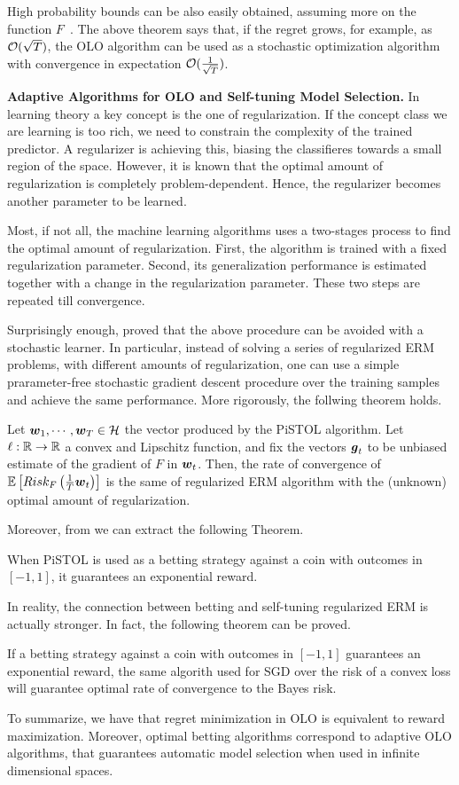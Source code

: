 High probability bounds can be also easily obtained, assuming more on the function $F$~\citep{Cesa-BianchiCG04}.
The above theorem says that, if the regret grows, for example, as $\mathcal{O}(\sqrt{T})$, the OLO algorithm can be used as a stochastic optimization algorithm with convergence in expectation $\mathcal{O}(\frac{1}{\sqrt{T}})$.

\textbf{Adaptive Algorithms for OLO and Self-tuning Model Selection.}
In learning theory a key concept is the one of regularization. If the concept class we are learning is too rich, we need to constrain the complexity of the trained predictor. A regularizer is achieving this, biasing the classifieres towards a small region of the space. However, it is known that the optimal amount of regularization is completely problem-dependent. Hence, the regularizer becomes another parameter to be learned.

Most, if not all, the machine learning algorithms uses a two-stages process to find the optimal amount of regularization. First, the algorithm is trained with a fixed regularization parameter. Second, its generalization performance is estimated together with a change in the regularization parameter. These two steps are repeated till convergence.

Surprisingly enough, \citep{Orabona14} proved that the above procedure can be avoided with a stochastic learner. In particular, instead of solving a series of regularized ERM problems, with different amounts of regularization, one can use a simple prarameter-free stochastic gradient descent procedure over the training samples and achieve the same performance.
More rigorously, the follwing theorem holds.
\begin{theorem}
Let $\boldsymbol{w}_1, \cdots, \boldsymbol{w}_T \in \mathcal{H}$ the vector produced by the PiSTOL algorithm.
Let $\ell:\mathbb{R}\rightarrow\mathbb{R}$ a convex and Lipschitz function, and fix the vectors $\boldsymbol{g}_t$ to be unbiased estimate of the gradient of $F$ in $\boldsymbol{w}_t$. Then, the rate of convergence of $\mathbb{E}\left[Risk_F\left(\frac{1}{T} \boldsymbol{w}_t\right)\right]$ is the same of regularized ERM algorithm with the (unknown) optimal amount of regularization.
\end{theorem}

Moreover, from \citep{} we can extract the following Theorem.
\begin{theorem}
When PiSTOL is used as a betting strategy against a coin with outcomes in $[-1,1]$, it guarantees an exponential reward.
\end{theorem}

In reality, the connection between betting and self-tuning regularized ERM is actually stronger. In fact, the following theorem can be proved.
\begin{theorem}
If a betting strategy against a coin with outcomes in $[-1,1]$ guarantees an exponential reward, the same algorith used for SGD over the risk of a convex loss will guarantee optimal rate of convergence to the Bayes risk.
\end{theorem}

To summarize, we have that regret minimization in OLO is equivalent to reward maximization. Moreover, optimal betting algorithms correspond to adaptive OLO algorithms, that guarantees automatic model selection when used in infinite dimensional spaces.